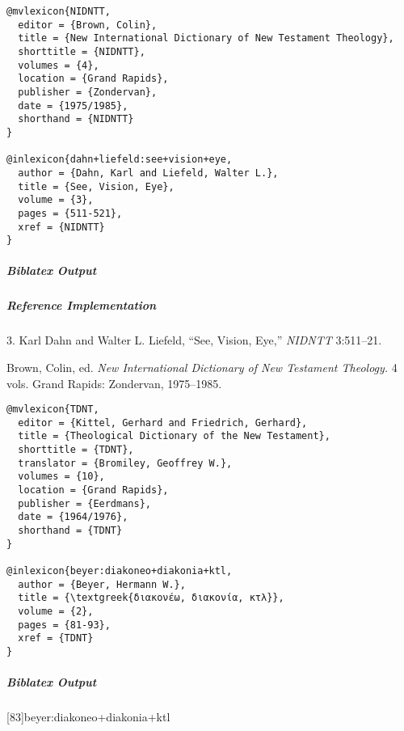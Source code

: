 \documentclass[a4paper]{article}
\newcommand{\textgreek}[1]{{\greekfont #1}}
\newenvironment{biboutput}{%
  \subparagraph{Biblatex Output}
}{\color{black}}
\newenvironment{refimp}{%
  \subparagraph{Reference Implementation}
  \color{reference-colour}
  \rm
}{\par\color{black}}
\begin{document}
\begin{lstlisting}
@mvlexicon{NIDNTT,
  editor = {Brown, Colin},
  title = {New International Dictionary of New Testament Theology},
  shorttitle = {NIDNTT},
  volumes = {4},
  location = {Grand Rapids},
  publisher = {Zondervan},
  date = {1975/1985},
  shorthand = {NIDNTT}
}

@inlexicon{dahn+liefeld:see+vision+eye,
  author = {Dahn, Karl and Liefeld, Walter L.},
  title = {See, Vision, Eye},
  volume = {3},
  pages = {511-521},
  xref = {NIDNTT}
}
\end{lstlisting}

\begin{biboutput}
\end{biboutput}

\begin{refimp}
  \hspace*{\bibindent}3. Karl Dahn and Walter L. Liefeld, “See, Vision, Eye,”
  \emph{NIDNTT} 3:511–21.

  \hangindent\bibindent Brown, Colin, ed. \emph{New International Dictionary
  of New Testament Theology.} 4 vols. Grand Rapids: Zondervan, 1975–1985.

\end{refimp}

\medskip

\begin{lstlisting}
@mvlexicon{TDNT,
  editor = {Kittel, Gerhard and Friedrich, Gerhard},
  title = {Theological Dictionary of the New Testament},
  shorttitle = {TDNT},
  translator = {Bromiley, Geoffrey W.},
  volumes = {10},
  location = {Grand Rapids},
  publisher = {Eerdmans},
  date = {1964/1976},
  shorthand = {TDNT}
}

@inlexicon{beyer:diakoneo+diakonia+ktl,
  author = {Beyer, Hermann W.},
  title = {\textgreek{διακονέω, διακονία, κτλ}},
  volume = {2},
  pages = {81-93},
  xref = {TDNT}
}
\end{lstlisting}
  
\begin{biboutput}
  [83]{beyer:diakoneo+diakonia+ktl}
\end{biboutput}
\end{document}
